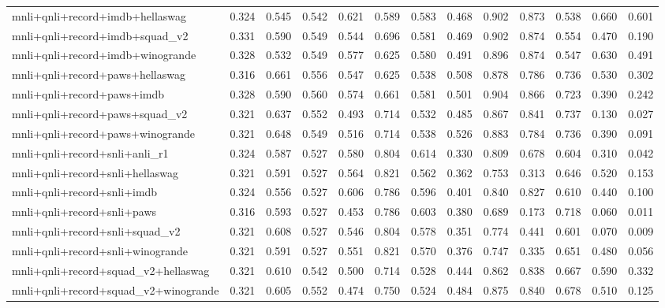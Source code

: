 \begin{table}[t]
\begin{tabular}{lrrrrrrrrrrrr}
    mnli+qnli+record+imdb+hellaswag & 0.324 & 0.545 & 0.542 & 0.621 & 0.589 & 0.583 & 0.468 & 0.902 & 0.873 & 0.538 & 0.660 & 0.601 \\
    mnli+qnli+record+imdb+squad\_v2 & 0.331 & 0.590 & 0.549 & 0.544 & 0.696 & 0.581 & 0.469 & 0.902 & 0.874 & 0.554 & 0.470 & 0.190 \\
    mnli+qnli+record+imdb+winogrande & 0.328 & 0.532 & 0.549 & 0.577 & 0.625 & 0.580 & 0.491 & 0.896 & 0.874 & 0.547 & 0.630 & 0.491 \\
    mnli+qnli+record+paws+hellaswag & 0.316 & 0.661 & 0.556 & 0.547 & 0.625 & 0.538 & 0.508 & 0.878 & 0.786 & 0.736 & 0.530 & 0.302 \\
    mnli+qnli+record+paws+imdb & 0.328 & 0.590 & 0.560 & 0.574 & 0.661 & 0.581 & 0.501 & 0.904 & 0.866 & 0.723 & 0.390 & 0.242 \\
    mnli+qnli+record+paws+squad\_v2 & 0.321 & 0.637 & 0.552 & 0.493 & 0.714 & 0.532 & 0.485 & 0.867 & 0.841 & 0.737 & 0.130 & 0.027 \\
    mnli+qnli+record+paws+winogrande & 0.321 & 0.648 & 0.549 & 0.516 & 0.714 & 0.538 & 0.526 & 0.883 & 0.784 & 0.736 & 0.390 & 0.091 \\
    mnli+qnli+record+snli+anli\_r1 & 0.324 & 0.587 & 0.527 & 0.580 & 0.804 & 0.614 & 0.330 & 0.809 & 0.678 & 0.604 & 0.310 & 0.042 \\
    mnli+qnli+record+snli+hellaswag & 0.321 & 0.591 & 0.527 & 0.564 & 0.821 & 0.562 & 0.362 & 0.753 & 0.313 & 0.646 & 0.520 & 0.153 \\
    mnli+qnli+record+snli+imdb & 0.324 & 0.556 & 0.527 & 0.606 & 0.786 & 0.596 & 0.401 & 0.840 & 0.827 & 0.610 & 0.440 & 0.100 \\
    mnli+qnli+record+snli+paws & 0.316 & 0.593 & 0.527 & 0.453 & 0.786 & 0.603 & 0.380 & 0.689 & 0.173 & 0.718 & 0.060 & 0.011 \\
    mnli+qnli+record+snli+squad\_v2 & 0.321 & 0.608 & 0.527 & 0.546 & 0.804 & 0.578 & 0.351 & 0.774 & 0.441 & 0.601 & 0.070 & 0.009 \\
    mnli+qnli+record+snli+winogrande & 0.321 & 0.591 & 0.527 & 0.551 & 0.821 & 0.570 & 0.376 & 0.747 & 0.335 & 0.651 & 0.480 & 0.056 \\
    mnli+qnli+record+squad\_v2+hellaswag & 0.321 & 0.610 & 0.542 & 0.500 & 0.714 & 0.528 & 0.444 & 0.862 & 0.838 & 0.667 & 0.590 & 0.332 \\
    mnli+qnli+record+squad\_v2+winogrande & 0.321 & 0.605 & 0.552 & 0.474 & 0.750 & 0.524 & 0.484 & 0.875 & 0.840 & 0.678 & 0.510 & 0.125 \\

\end{tabular}
\end{table}
